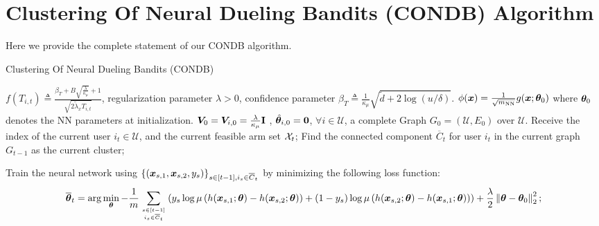 \onecolumn
\allowdisplaybreaks

\section{Clustering Of Neural Dueling Bandits (CONDB) Algorithm}
\label{app:sec:condb:algo}
Here we provide the complete statement of our CONDB algorithm.

\begin{algorithm*}[h] 
\caption{Clustering Of Neural Dueling Bandits (CONDB)}
\label{algo:neural:dueling:bandits}
	\begin{algorithmic}[1]
     $f(T_{i,t}) \triangleq \frac{\beta_T + B \sqrt{\frac{\lambda}{\kappa_\mu}} + 1}{\sqrt{2\tilde{\lambda}_x T_{i,t}}}$, regularization parameter $\lambda>0$, confidence parameter $\beta_T \triangleq \frac{1}{\kappa_\mu} \sqrt{ \widetilde{d} + 2\log(u/\delta)}$.
    $\phi(\boldsymbol{x}) = \frac{1}{\sqrt{m_{\text{NN}}}}g(\boldsymbol{x};\boldsymbol{\theta}_0)$ where $\boldsymbol{\theta}_0$ denotes the NN parameters at initialization.
$\boldsymbol{V}_0=\boldsymbol{V}_{i,0} = \frac{\lambda}{\kappa_\mu} \mathbf{I}$ , $\hat{\boldsymbol{\theta}}_{i,0}=\boldsymbol{0}$, $\forall{i \in \mathcal{U}}$, a complete Graph $G_0 = (\mathcal{U},E_0)$ over $\mathcal{U}$.
            \STATE Receive the index of the current user $i_t\in\mathcal{U}$, and the current feasible arm set $\mathcal{X}_t$;\label{user serve neural}
            \STATE Find the connected component $\overline C_t$ for user $i_t$ in the current graph $G_{t-1}$ as the current cluster; 

            \STATE Train the neural network using $\{(\boldsymbol{x}_{s,1}, \boldsymbol{x}_{s,2}, y_s)\}_{s\in[t-1], i_s\in \overline C_t}$ by minimizing the following loss function:
            \begin{equation}
                \overline{\boldsymbol{\theta}}_t=\arg\min_{\boldsymbol{\theta}} 
                - \frac{1}{m} \sum_{s\in[t-1]\atop i_s\in \overline C_t}\left( y_s\log\mu\left( h(\boldsymbol{x}_{s,1};\boldsymbol{\theta}) - h(\boldsymbol{x}_{s,2};\boldsymbol{\theta}) \right) + (1-y_s)\log\mu\left(h(\boldsymbol{x}_{s,2};\boldsymbol{\theta}) - h(\boldsymbol{x}_{s,1};\boldsymbol{\theta})\right) \right) + \frac{\lambda}{2}\left\| \boldsymbol{\theta} - \boldsymbol{\theta}_0 \right\|_2^2;
            \end{equation}
            

\end{algorithmic}
\end{algorithm*}
